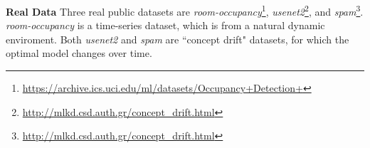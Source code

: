 \documentclass{article}
\begin{document}
\textbf{Real Data}
Three real public datasets are \textit{room-occupancy}\footnote{\url{https://archive.ics.uci.edu/ml/datasets/Occupancy+Detection+}},  \textit{usenet2}\footnote{\url{http://mlkd.csd.auth.gr/concept_drift.html}}, and \textit{spam}\footnote{\url{http://mlkd.csd.auth.gr/concept_drift.html}}. \textit{room-occupancy} is a time-series dataset, which is from a natural dynamic enviroment. Both \textit{usenet2} and \textit{spam} are  ``concept drift" \citep{Katakis:2010:TR} datasets, for which the optimal model changes over time.

\end{document}
